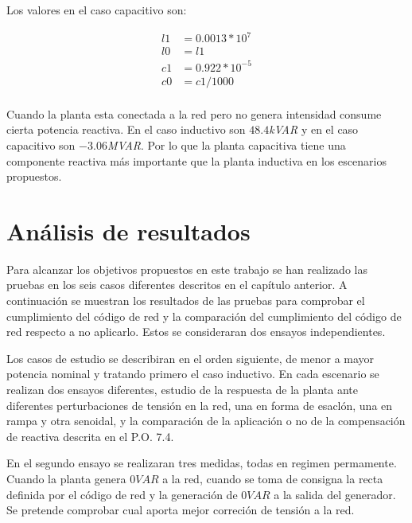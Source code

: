 \documentclass{book}
\begin{document}
Los valores en el caso capacitivo son: 

\begin{equation}
\begin{split}
l1 & =0.0013*10^{7} \\
l0 & =l1\\
c1 & =0.922*10^{-5} \\
c0 & =c1/1000 \\
\end{split}
\end{equation}

Cuando la planta esta conectada a la red pero no genera intensidad consume cierta potencia reactiva. En el caso inductivo son $48.4$\emph{kVAR} y en el caso capacitivo son $-3.06$\emph{MVAR}. Por lo que la planta capacitiva tiene una componente reactiva m\'as importante que la planta inductiva en los escenarios propuestos. \par



\chapter{An\'alisis de resultados}

Para alcanzar los objetivos propuestos en este trabajo se han realizado las pruebas en los seis casos diferentes descritos en el cap\'itulo anterior. A continuaci\'on se muestran los resultados de las pruebas para comprobar el cumplimiento del c\'odigo de red y la comparaci\'on del cumplimiento del c\'odigo de red respecto a no aplicarlo. Estos se consideraran dos ensayos independientes. \par

Los casos de estudio se describiran en el orden siguiente, de menor a mayor potencia nominal y tratando primero el caso inductivo. En cada escenario se realizan dos ensayos diferentes, estudio de la respuesta de la planta ante diferentes perturbaciones de tensi\'on en la red, una en forma de esaclón, una en rampa y otra senoidal, y la comparaci\'on de la aplicaci\'on o no de la compensaci\'on de reactiva descrita en el P.O. 7.4.\par

En el segundo ensayo se realizaran tres medidas, todas en regimen permamente. Cuando la planta genera $0 VAR$ a la red, cuando se toma de consigna la recta definida por el c\'odigo de red y la generaci\'on de $0VAR$ a la salida  del generador. Se pretende comprobar cual aporta mejor correci\'on de tensi\'on a la red. \par 
\end{document}

